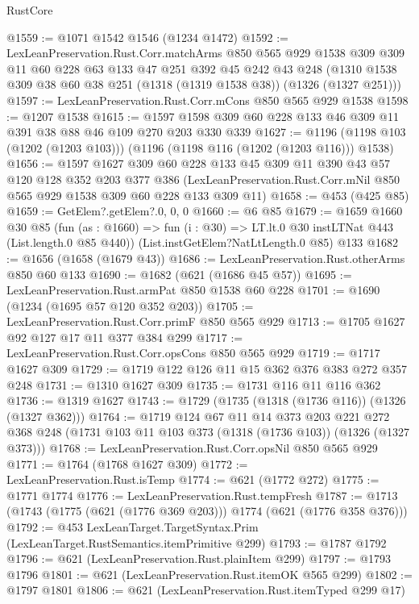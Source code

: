 \begin{lexlean}{RustCore}
\begin{coremodule}
@1559 := @1071 @1542 @1546 (@1234 @1472)
@1592 := LexLeanPreservation.Rust.Corr.matchArms
    @850
    @565
    @929
    @1538
    @309
    @309
    @11
    @60
    @228
    @63
    @133
    @47
    @251
    @392
    @45
    @242
    @43
    @248
    (@1310 @1538 @309 @38 @60 @38 @251 (@1318 (@1319 @1538 @38)) (@1326 (@1327 @251)))
@1597 := LexLeanPreservation.Rust.Corr.mCons @850 @565 @929 @1538
@1598 := @1207 @1538
@1615 := @1597 @1598 @309 @60 @228 @133 @46 @309 @11 @391 @38 @88 @46 @109 @270 @203 @330 @339
@1627 := @1196 (@1198 @103 (@1202 (@1203 @103))) (@1196 (@1198 @116 (@1202 (@1203 @116))) @1538)
@1656 := @1597
    @1627
    @309
    @60
    @228
    @133
    @45
    @309
    @11
    @390
    @43
    @57
    @120
    @128
    @352
    @203
    @377
    @386
    (LexLeanPreservation.Rust.Corr.mNil @850 @565 @929 @1538 @309 @60 @228 @133 @309 @11)
@1658 := @453 (@425 @85)
@1659 := GetElem?.getElem?.{0, 0, 0}
@1660 := @6 @85
@1679 := @1659
    @1660
    @30
    @85
    (fun (as : @1660) => fun (i : @30) => LT.lt.{0} @30 instLTNat @443 (List.length.{0} @85 @440))
    (List.instGetElem?NatLtLength.{0} @85)
    @133
@1682 := @1656 (@1658 (@1679 @43))
@1686 := LexLeanPreservation.Rust.otherArms @850 @60 @133
@1690 := @1682 (@621 (@1686 @45 @57))
@1695 := LexLeanPreservation.Rust.armPat @850 @1538 @60 @228
@1701 := @1690 (@1234 (@1695 @57 @120 @352 @203))
@1705 := LexLeanPreservation.Rust.Corr.primF @850 @565 @929
@1713 := @1705 @1627 @92 @127 @17 @11 @377 @384 @299
@1717 := LexLeanPreservation.Rust.Corr.opsCons @850 @565 @929
@1719 := @1717 @1627 @309
@1729 := @1719 @122 @126 @11 @15 @362 @376 @383 @272 @357 @248
@1731 := @1310 @1627 @309
@1735 := @1731 @116 @11 @116 @362
@1736 := @1319 @1627
@1743 := @1729 (@1735 (@1318 (@1736 @116)) (@1326 (@1327 @362)))
@1764 := @1719
    @124
    @67
    @11
    @14
    @373
    @203
    @221
    @272
    @368
    @248
    (@1731 @103 @11 @103 @373 (@1318 (@1736 @103)) (@1326 (@1327 @373)))
@1768 := LexLeanPreservation.Rust.Corr.opsNil @850 @565 @929
@1771 := @1764 (@1768 @1627 @309)
@1772 := LexLeanPreservation.Rust.isTemp
@1774 := @621 (@1772 @272)
@1775 := @1771 @1774
@1776 := LexLeanPreservation.Rust.tempFresh
@1787 := @1713 (@1743 (@1775 (@621 (@1776 @369 @203))) @1774 (@621 (@1776 @358 @376)))
@1792 := @453 LexLeanTarget.TargetSyntax.Prim (LexLeanTarget.RustSemantics.itemPrimitive @299)
@1793 := @1787 @1792
@1796 := @621 (LexLeanPreservation.Rust.plainItem @299)
@1797 := @1793 @1796
@1801 := @621 (LexLeanPreservation.Rust.itemOK @565 @299)
@1802 := @1797 @1801
@1806 := @621 (LexLeanPreservation.Rust.itemTyped @299 @17)

\end{coremodule}
\end{lexlean}
